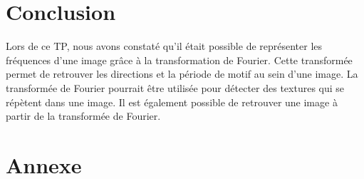 \documentclass[a4paper,11pt]{article}
\begin{document}
  \section*{Conclusion}
  
  Lors de ce TP, nous avons constaté qu'il était possible de représenter les fréquences d'une image grâce à la 
  transformation de Fourier. Cette transformée permet de retrouver les directions et la période de motif au sein 
  d'une image. La transformée de Fourier pourrait être utilisée pour détecter des textures qui se répètent dans une
  image. Il est également possible de retrouver une image à partir de la transformée de Fourier.
  
  \newpage
  \section*{Annexe}
  
\end{document}
